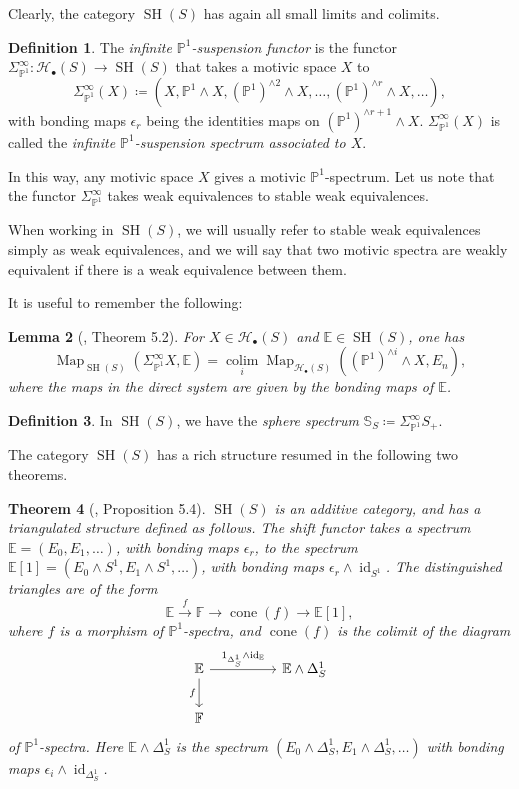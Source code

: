 \documentclass[10pt]{amsart}
\theoremstyle{definition}
\newtheorem{defn}{Definition}[section]
\theoremstyle{plain}
\newtheorem{thm}[defn]{Theorem}
\newtheorem{lemma}[defn]{Lemma}
\numberwithin{equation}{section}
\newcommand{\0}{\emptyset}
\newcommand{\sH}{{\mathcal H}}
\newcommand{\E}{{\mathbb E}}
\newcommand{\F}{{\mathbb F}}
\renewcommand{\P}{{\mathbb P}}
\newcommand{\SH}{{\operatorname{SH}}}
\newcommand{\Map}{{\operatorname{Map}}}
\newcommand{\id}{{\operatorname{id}}}
\newcommand{\colim}{{\operatorname*{colim}}}
\newcommand{\cone}{{\operatorname{cone}}}
\begin{document}
Clearly, the category $\SH(S)$ has again all small limits and colimits.

\begin{defn}
    The \emph{infinite $\P^1$-suspension functor} is the functor $\Sigma_{\P^1}^\infty:\sH_{\bullet}(S)\to \SH(S)$ that takes a motivic space $X$ to  
    $$\Sigma_{\P^1}^\infty(X) \coloneqq (X, \P^1 \wedge X, (\P^1)^{\wedge 2} \wedge X, \ldots, (\P^1)^{\wedge r}\wedge X, \ldots),$$
    with bonding maps $\epsilon_r$ being the identities maps on $(\P^1)^{\wedge r+1}\wedge X$. $\Sigma_{\P^1}^\infty(X)$ is called the \emph{infinite $\P^1$-suspension spectrum associated to $X$}.
\end{defn}

In this way, any motivic space $X$ gives a motivic $\P^1$-spectrum. Let us note that the functor $\Sigma_{\P^1}^\infty$ takes weak equivalences to stable weak equivalences.

When working in $\SH(S)$, we will usually refer to stable weak equivalences simply as weak equivalences, and we will say that two motivic spectra are weakly equivalent if there is a weak equivalence between them.

It is useful to remember the following:
\begin{lemma}[\cite{voe:homotopy_theory}, Theorem 5.2]
\label{lemma:stablehom}
    For $X \in \sH_{\bullet}(S)$ and $\E \in \SH(S)$, one has
    $$\Map_{\SH(S)}(\Sigma^{\infty}_{\P^1}X, \E) = \colim_i \Map_{\sH_{\bullet}(S)}((\P^1)^{\wedge i}\wedge X, E_n),$$
    where the maps in the direct system are given by the bonding maps of $\E$.
\end{lemma}
\begin{defn}
    In $\SH(S)$, we have the \emph{sphere spectrum} $\mathbb{S}_S \coloneqq \Sigma_{\P^1}^\infty S_+$.
\end{defn}

The category $\SH(S)$ has a rich structure resumed in the following two theorems.

\begin{thm} [\cite{voe:homotopy_theory}, Proposition 5.4]
    $\SH(S)$ is an additive category, and has a triangulated structure defined as follows. The shift functor takes a spectrum $\E=(E_0,E_1,\ldots)$, with bonding maps $\epsilon_r$, to the spectrum $\E[1]=(E_0 \wedge S^1, E_1 \wedge S^1, \ldots)$, with bonding maps $\epsilon_r \wedge \id_{S^1}$. The distinguished triangles are of the form
    $$\E \xrightarrow{f} \F \to \cone (f) \to \E[1],$$
    where $f$ is a morphism of $\P^1$-spectra, and $\cone (f)$ is the colimit of the diagram
    $$
    \begin{tikzcd}
        \E \arrow[rr, "1_{\Delta_S^1} \wedge \id_\E"] \arrow[d, swap, "f"] & & \E \wedge \Delta_S^1 \\
        \F & &
    \end{tikzcd}
    $$
    of $\P^1$-spectra. Here $\E \wedge \Delta_S^1$ is the spectrum $(E_0 \wedge \Delta_S^1, E_1 \wedge \Delta_S^1, \ldots)$ with bonding maps $\epsilon_i \wedge \id_{\Delta_S^1}$. 
\end{thm}
\end{document}
